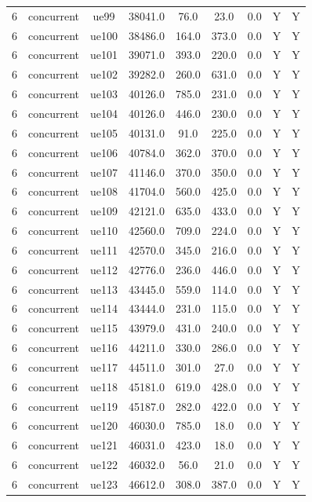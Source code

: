 \begin{table}[ht]
\begin{tabular}{|c|c|c|c|c|c|c|c|c|}
6 & concurrent & ue99 & 38041.0 & 76.0 & 23.0 & 0.0 & Y & Y \\
6 & concurrent & ue100 & 38486.0 & 164.0 & 373.0 & 0.0 & Y & Y \\
6 & concurrent & ue101 & 39071.0 & 393.0 & 220.0 & 0.0 & Y & Y \\
6 & concurrent & ue102 & 39282.0 & 260.0 & 631.0 & 0.0 & Y & Y \\
6 & concurrent & ue103 & 40126.0 & 785.0 & 231.0 & 0.0 & Y & Y \\
6 & concurrent & ue104 & 40126.0 & 446.0 & 230.0 & 0.0 & Y & Y \\
6 & concurrent & ue105 & 40131.0 & 91.0 & 225.0 & 0.0 & Y & Y \\
6 & concurrent & ue106 & 40784.0 & 362.0 & 370.0 & 0.0 & Y & Y \\
6 & concurrent & ue107 & 41146.0 & 370.0 & 350.0 & 0.0 & Y & Y \\
6 & concurrent & ue108 & 41704.0 & 560.0 & 425.0 & 0.0 & Y & Y \\
6 & concurrent & ue109 & 42121.0 & 635.0 & 433.0 & 0.0 & Y & Y \\
6 & concurrent & ue110 & 42560.0 & 709.0 & 224.0 & 0.0 & Y & Y \\
6 & concurrent & ue111 & 42570.0 & 345.0 & 216.0 & 0.0 & Y & Y \\
6 & concurrent & ue112 & 42776.0 & 236.0 & 446.0 & 0.0 & Y & Y \\
6 & concurrent & ue113 & 43445.0 & 559.0 & 114.0 & 0.0 & Y & Y \\
6 & concurrent & ue114 & 43444.0 & 231.0 & 115.0 & 0.0 & Y & Y \\
6 & concurrent & ue115 & 43979.0 & 431.0 & 240.0 & 0.0 & Y & Y \\
6 & concurrent & ue116 & 44211.0 & 330.0 & 286.0 & 0.0 & Y & Y \\
6 & concurrent & ue117 & 44511.0 & 301.0 & 27.0 & 0.0 & Y & Y \\
6 & concurrent & ue118 & 45181.0 & 619.0 & 428.0 & 0.0 & Y & Y \\
6 & concurrent & ue119 & 45187.0 & 282.0 & 422.0 & 0.0 & Y & Y \\
6 & concurrent & ue120 & 46030.0 & 785.0 & 18.0 & 0.0 & Y & Y \\
6 & concurrent & ue121 & 46031.0 & 423.0 & 18.0 & 0.0 & Y & Y \\
6 & concurrent & ue122 & 46032.0 & 56.0 & 21.0 & 0.0 & Y & Y \\
6 & concurrent & ue123 & 46612.0 & 308.0 & 387.0 & 0.0 & Y & Y \\

\end{tabular}
\end{table}
